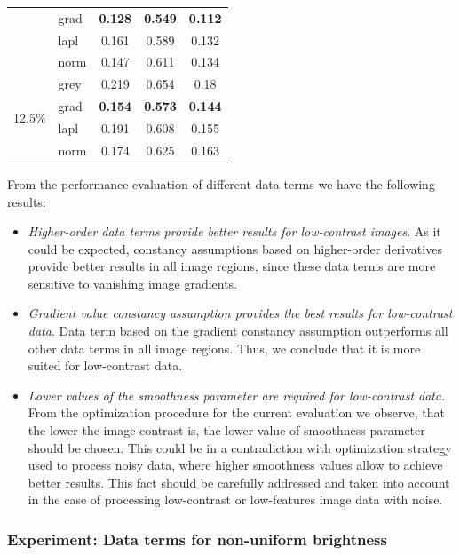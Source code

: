 \begin{table}[ht]
\begin{tabular}{clccc}
          & grad  & \textbf{0.128} & \textbf{0.549} & \textbf{0.112} \\
          & lapl  & 0.161 & 0.589 & 0.132 \\
          & norm  & 0.147 & 0.611 & 0.134 \\
          \midrule
    \multicolumn{1}{l}{\multirow{4}[1]{*}{12.5\%}} & grey  & 0.219 & 0.654 & 0.18 \\
          & grad  & \textbf{0.154} & \textbf{0.573} & \textbf{0.144} \\
          & lapl  & 0.191 & 0.608 & 0.155 \\
          & norm  & 0.174 & 0.625 & 0.163 \\
    \bottomrule
    \end{tabular}%
  \label{tab:exp_data_terms_contrast}%
\end{table}%

From the performance evaluation of different data terms we have the following results:
\begin{itemize}
	\item \textit{Higher-order data terms provide better results for low-contrast images}. As it could be expected, constancy assumptions based on higher-order derivatives provide better results in all image regions, since these data terms are more sensitive to vanishing image gradients. 
	    
	\item \textit{Gradient value constancy assumption provides the best results for low-contrast data}. Data term based on the gradient constancy assumption outperforms all other data terms in all image regions. Thus, we conclude that it is more suited for low-contrast data.   
	
	\item \textit{Lower values of the smoothness parameter are required for low-contrast data}. From the optimization procedure for the current evaluation we observe, that the lower the image contrast is, the lower value of smoothness parameter should be chosen. This could be in a contradiction with optimization strategy used to process noisy data, where higher smoothness values allow to achieve better results. This fact should be carefully addressed and taken into account in the case of processing low-contrast or low-features image data with noise.
\end{itemize}



\subsubsection{Experiment: Data terms for non-uniform brightness}
\label{exp_data_terms_brighntness}


